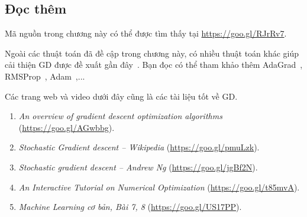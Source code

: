  
 
 
 
 
 
\subsection{Đọc thêm}

Mã nguồn trong chương này có thể được tìm thấy tại
\url{https://goo.gl/RJrRv7}. 

Ngoài các thuật toán đã đề cập trong chương này, có nhiều thuật toán khác giúp
cải thiện GD được đề xuất gần đây~\cite{ruder2016overview}. Bạn
đọc có thể tham khảo thêm AdaGrad~\cite{duchi2011adaptive},
RMSProp~\cite{tieleman2012lecture}, Adam~\cite{kingma2014adam},...

Các trang web và video dưới đây cũng là các tài liệu tốt về GD.
\begin{enumerate}
 
    \item \textit{An overview of gradient descent optimization algorithms}
    (\url{https://goo.gl/AGwbbg}).
 
    \item \textit{Stochastic Gradient descent -- Wikipedia}
    (\url{https://goo.gl/pmuLzk}). 

    \item \textit{Stochastic gradient descent -- Andrew Ng} (\url{https://goo.gl/jgBf2N}). 
     
    \item  \textit{An Interactive Tutorial on Numerical Optimization}
    (\url{https://goo.gl/t85mvA}). 

    \item \textit{Machine Learning cơ bản, Bài 7, 8} (\url{https://goo.gl/US17PP}).

\end{enumerate}
